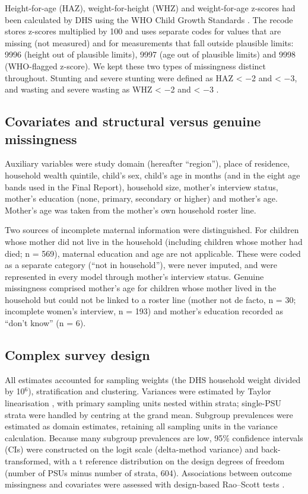 \documentclass[11pt,a4paper]{article}
\begin{document}
Height-for-age (HAZ), weight-for-height (WHZ) and weight-for-age
z-scores had been calculated by DHS using the WHO Child Growth Standards
\cite{who2006child}. The recode stores z-scores multiplied by 100 and
uses separate codes for values that are missing (not measured) and for
measurements that fall outside plausible limits: 9996 (height out of
plausible limits), 9997 (age out of plausible limits) and 9998
(WHO-flagged z-score). We kept these two types of missingness distinct
throughout. Stunting and severe stunting were defined as HAZ \textless{}
$-$2 and \textless{} $-$3, and wasting and severe wasting as WHZ \textless{}
$-$2 and \textless{} $-$3 \cite{who2006child}.

\subsection{Covariates and structural versus genuine
missingness}\label{covariates-and-structural-versus-genuine-missingness}

Auxiliary variables were study domain (hereafter ``region''), place of
residence, household wealth quintile, child's sex, child's age in months
(and in the eight age bands used in the Final Report), household size,
mother's interview status, mother's education (none, primary, secondary
or higher) and mother's age. Mother's age was taken from the mother's
own household roster line.

Two sources of incomplete maternal information were distinguished. For
children whose mother did not live in the household (including children
whose mother had died; n = 569), maternal education and age are not
applicable. These were coded as a separate category (``not in
household''), were never imputed, and were represented in every model
through mother's interview status. Genuine missingness comprised
mother's age for children whose mother lived in the household but could
not be linked to a roster line (mother not de facto, n = 30; incomplete
women's interview, n = 193) and mother's education recorded as ``don't
know'' (n = 6).

\subsection{Complex survey design}\label{complex-survey-design}

All estimates accounted for sampling weights (the DHS household weight
divided by 10$^6$), stratification and clustering. Variances were estimated
by Taylor linearisation \cite{lumley2004analysis}, with primary sampling
units nested within strata; single-PSU strata were handled by centring
at the grand mean. Subgroup prevalences were estimated as domain
estimates, retaining all sampling units in the variance calculation.
Because many subgroup prevalences are low, 95\% confidence intervals
(CIs) were constructed on the logit scale (delta-method variance) and
back-transformed, with a t reference distribution on the design degrees
of freedom (number of PSUs minus number of strata, 604). Associations
between outcome missingness and covariates were assessed with
design-based Rao--Scott tests \cite{rao1984chisquared}.
\end{document}
